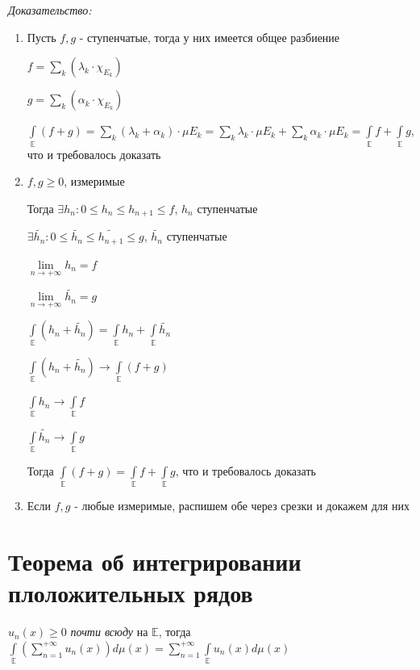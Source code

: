 \documentclass[paper=a4, fontsize=17pt]{article}
\begin{document}
\emph{Доказательство:}

\begin{enumerate}
	\item Пусть $f, g$ - ступенчатые, тогда у них имеется общее разбиение

	$f = \sum\limits_{k}(\lambda_k \cdot \chi_{E_k})$

	$g = \sum\limits_{k}(\alpha_k \cdot \chi_{E_k})$

	$\int\limits_{\mathds{E}} (f + g) = \sum\limits_k (\lambda_k + \alpha_k) \cdot \mu E_k = \sum\limits_k \lambda_k \cdot \mu E_k + \sum\limits_k \alpha_k \cdot \mu E_k = \int\limits_{\mathds{E}} f + \int\limits_{\mathds{E}} g$, что и требовалось доказать

	\item $f, g \geqslant 0$, измеримые

	Тогда $\exists h_n: 0 \leqslant h_n \leqslant h_{n + 1} \leqslant f$, $h_n$ ступенчатые

	$\exists \widetilde{h_n}: 0 \leqslant \widetilde{h_n} \leqslant \widetilde{h_{n + 1}} \leqslant g$, $\widetilde{h_n}$ ступенчатые

	$\lim\limits_{n \rightarrow +\infty} h_n = f$

	$\lim\limits_{n \rightarrow +\infty} \widetilde{h_n} = g$

	$\int\limits_{\mathds{E}} (h_n + \widetilde{h_n}) = \int\limits_{\mathds{E}} h_n + \int\limits_{\mathds{E}} \widetilde{h_n}$

	$\int\limits_{\mathds{E}} (h_n + \widetilde{h_n}) \rightarrow \int\limits_{\mathds{E}} (f + g)$

	$\int\limits_{\mathds{E}} h_n \rightarrow \int\limits_{\mathds{E}} f$

	$\int\limits_{\mathds{E}} \widetilde{h_n} \rightarrow \int\limits_{\mathds{E}} g$

	Тогда $\int\limits_{\mathds{E}} (f + g) = \int\limits_{\mathds{E}} f + \int\limits_{\mathds{E}} g$, что и требовалось доказать

	\item
	Если $f, g$ - любые измеримые, распишем обе через срезки и докажем для них
\end{enumerate}

\section{Теорема об интегрировании плоложительных рядов}
$u_n(x) \geq 0$ \textit{почти всюду} на $\mathds{E}$, тогда
$\int\limits_{\mathds{E}} (\sum\limits_{n=1}^{+\infty}u_n(x))d\mu(x) =
\sum\limits_{n=1}^{+\infty} \int\limits_{\mathds{E}} u_n(x)d\mu(x)$
\end{document}
